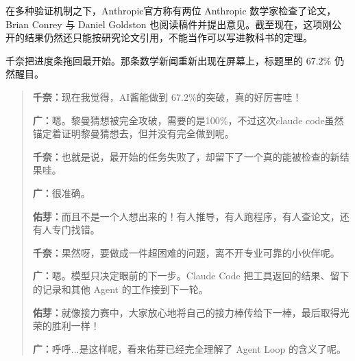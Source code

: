 在多种验证机制之下，Anthropic官方称有两位 Anthropic 数学家检查了论文，Brian Conrey 与 Daniel Goldston 也阅读稿件并提出意见。截至现在，这项刚公开的结果仍然还只能按研究论文引用，不能当作可以写进教科书的定理。\cite{ch03riemannweb,ch03riemannlean}

千奈把进度条拖回最开始。那条数学新闻重新出现在屏幕上，标题里的 $67.2\%$ 仍然醒目。

\begin{quote}

\textbf{千奈：}现在我觉得，AI酱能做到 $67.2\%$的突破，真的好厉害哇！

\textbf{广：}嗯。黎曼猜想被完全攻破，需要的是100\%，不过这次claude code虽然锚定着证明黎曼猜想去，但并没有完全做到呢。

\textbf{千奈：}也就是说，最开始的任务失败了，却留下了一个真的能被检查的新结果哇。

\textbf{广：}很准确。

\textbf{佑芽：}而且不是一个人想出来的！有人推导，有人跑程序，有人查论文，还有人专门找错。

\textbf{千奈：}果然呀，要做成一件超困难的问题，离不开专业可靠的小伙伴呢。

\textbf{广：}嗯。模型只决定眼前的下一步。Claude Code 把工具返回的结果、留下的记录和其他 Agent 的工作接到下一轮。

\textbf{佑芽：}就像接力赛中，大家放心地将自己的接力棒传给下一棒，最后取得光荣的胜利一样！

\textbf{广：}呼呼...是这样呢，看来佑芽已经完全理解了 Agent Loop 的含义了呢。

\end{quote}

